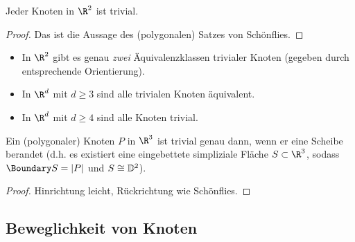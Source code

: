 \begin{prop}
    Jeder Knoten in $\R^2$ ist trivial.
    \begin{proof}
        Das ist die Aussage des (polygonalen) Satzes von Schönflies.
    \end{proof}
\end{prop}

\begin{nt}
    \begin{itemize}
        \item
            In $\R^2$ gibt es genau \emph{zwei} Äquivalenzklassen trivialer Knoten (gegeben durch entsprechende Orientierung).
        \item
            In $\R^d$ mit $d \ge 3$ sind alle trivialen Knoten äquivalent.
        \item
            In $\R^d$ mit $d \ge 4$ sind alle Knoten trivial.
    \end{itemize}
\end{nt}

\begin{ex}
    Ein (polygonaler) Knoten $P$ in $\R^3$ ist trivial genau dann, wenn er eine Scheibe berandet (d.h. es existiert eine eingebettete simpliziale Fläche $S \subset \R^3$, sodass $\Boundary S = |P|$ und $S \cong \mathbb { D }^2$).
    \begin{proof}
        Hinrichtung leicht, Rückrichtung wie Schönflies.
    \end{proof}
\end{ex}

\subsection{Beweglichkeit von Knoten}

